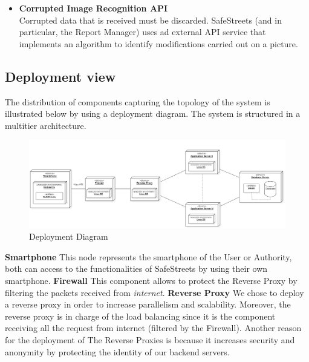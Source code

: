 \begin{itemize}
    \item\textbf{Corrupted Image Recognition API}\\
    Corrupted data that is received must be discarded. SafeStreets (and in particular, the Report Manager) uses ad external API service that implements an algorithm to identify modifications carried out on a picture.
    
\end{itemize}


\subsection{Deployment view}
The distribution of components capturing the topology of the system is illustrated below by using a deployment diagram.\newline
The system is structured in a multitier architecture.
\newline
\begin{figure}[H]
          \includegraphics[width=1.25\textwidth,left]{Images/deployment_diagram.png}
        \caption{Deployment Diagram}
\end{figure}
\noindent\textbf{Smartphone}\newline
This node represents the smartphone of the User or Authority, both can access to the functionalities of SafeStreets by using their own smartphone.
\newline
\textbf{Firewall}\newline
This component allows to protect the Reverse Proxy by filtering the packets received from \textit{internet}.
\newline
\textbf{Reverse Proxy}\newline
We chose to deploy a reverse proxy in order to increase parallelism and scalability. Moreover, the reverse proxy is in charge of the load balancing since it is the component receiving all the request from internet (filtered by the Firewall). Another reason for the deployment of The Reverse Proxies is because it increases security and anonymity by protecting the identity of our backend servers.


